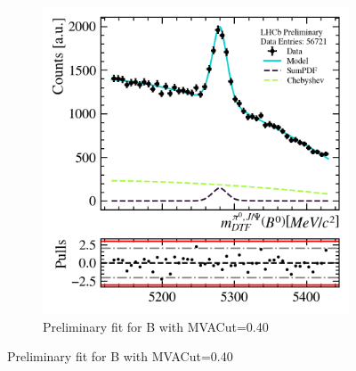 \usepackage{subcaption}
\begin{figure}
    \begin{subfigure}{width=0.49\textwidth}
        \includegraphics[width=\textwidth]{OutputFiles/PNGPlots/PreliminaryFit/MVAScan/b1dfit_mva0.40_jpsichannel.png}
        \caption{Preliminary fit for B with MVACut=0.40}
        \label{fig:prefit_mvascan_mvacut040_b}
    \end{subfigure}
\end{figure}